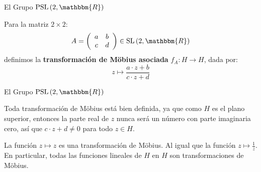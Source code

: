 \documentclass[xcolor=dvipsnames]{beamer}
\theoremstyle{largebreak}
\newcommand\cf[3]{\ensuremath{#1:#2\rightarrow#3}}
\newcommand{\bbm}[1]{\ensuremath{\mathbbm{#1}}}
\newcommand{\SL}[1]{\ensuremath{\textup{SL}\left(#1\right)}}
\newcommand{\PSL}[1]{\ensuremath{\textup{PSL}\left(#1\right)}}
\begin{document}
\begin{frame}{El Grupo $\PSL{2,\bbm{R}}$}
    \begin{mydef}
        Para la matriz $2\times 2$:
        \begin{equation*}
            A=\left(
                \begin{array}{cc}
                    a & b \\
                    c & d \\
                \end{array}
             \right)\in\SL{2,\bbm{R}}
        \end{equation*}
        definimos la \textbf{transformación de Möbius asociada} $\cf{f_A}{H}{H}$, dada por:
        \begin{equation*}
            z\mapsto\frac{a\cdot z+b}{c\cdot z+d}
        \end{equation*}
    \end{mydef}
\end{frame}

\begin{frame}{El Grupo $\PSL{2,\bbm{R}}$}
    \begin{obs}
        Toda transformación de Möbius está bien definida, ya que como $H$ es el plano superior, entonces la parte real de $z$ nunca será un número con parte imaginaria cero, así que $c\cdot z+d\neq 0$ para todo $z\in H$.
    \end{obs}

    \begin{exa}
        La función $z\mapsto z$ es una transformación de Möbius. Al igual que la función $z\mapsto\frac{1}{z}$. En particular, todas las funciones lineales de $H$ en $H$ son transformaciones de Möbius.
    \end{exa}
\end{frame}
\end{document}
